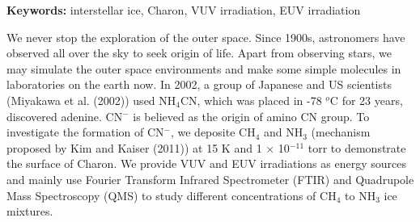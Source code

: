 \begin{abstracten}

{\bf \sf Keywords:} interstellar ice, Charon, VUV irradiation, EUV irradiation

\vspace{2em}

We never stop the exploration of the outer space. Since 1900s, astronomers have observed all over the sky to seek origin of life. Apart from observing stars, we may simulate the outer space environments and make some simple molecules in laboratories on the earth now. In 2002, a group of Japanese and US scientists (Miyakawa et al. (2002)\cite{miyakawa2002cold}) used NH$_4$CN, which was placed in -78 $^o$C for 23 years, discovered adenine. CN$^-$ is believed as the origin of amino CN group. To investigate the formation of CN$^-$, we deposite CH$_4$ and NH$_3$ (mechanism proposed by Kim and Kaiser (2011)\cite{kim}) at 15 K and 1 $\times$ 10$^{-11}$ torr to demonstrate the surface of Charon. We provide VUV and EUV irradiations as energy sources and mainly use Fourier Transform Infrared Spectrometer (FTIR) and Quadrupole Mass Spectroscopy (QMS) to study different concentrations of CH$_4$ to NH$_3$ ice mixtures.

\end{abstracten} 

